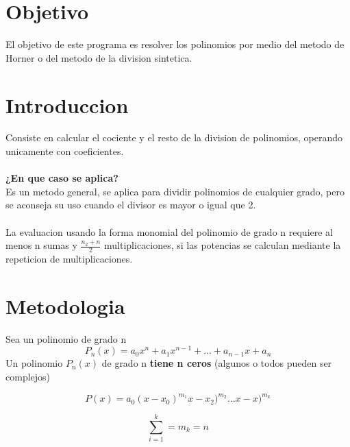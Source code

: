 \documentclass{article}
\begin{document}
\begin{multicols}{2}

\section{Objetivo}
\label{sec:obj}
  El objetivo de este programa es resolver los polinomios por medio del metodo de Horner o del metodo de la division sintetica.

\section{Introduccion}
\label{sec:Intro}
Consiste en calcular el cociente y el resto de la division de polinomios, operando unicamente con coeficientes.
\\
\\
\textbf{¿En que caso se aplica?}
\\
Es un metodo general, se aplica para dividir polinomios de cualquier grado, pero se aconseja su uso cuando el divisor es mayor o igual que 2.
\\
\\
La evaluacion usando la forma monomial del polinomio de grado n requiere al menos n sumas y $\frac{n_{2}+n}{2}$ multiplicaciones, si las potencias se calculan mediante la repeticion de multiplicaciones.
\section{Metodologia}
\label{sec:Met}
Sea un polinomio de grado n
\begin{equation}
P_{n}(x)=a_{0}x^{n}+a_{1}x^{n-1}+...+a_{n-1}x+a_{n}
\end{equation}
Un polinomio $P_{n}(x)$ de grado n \textbf{tiene n ceros} (algunos o todos pueden ser complejos)

\begin{equation}
P(x)=a_{0}(x-x_{0})^{m_{1}}x-x_{2})^{m_{2}}...x-x)^{m_{k}}
\end{equation}

\begin{equation}
\sum_{i=1}^{k}=m_{k}=n
\end{equation}


\end{multicols}
\end{document}
